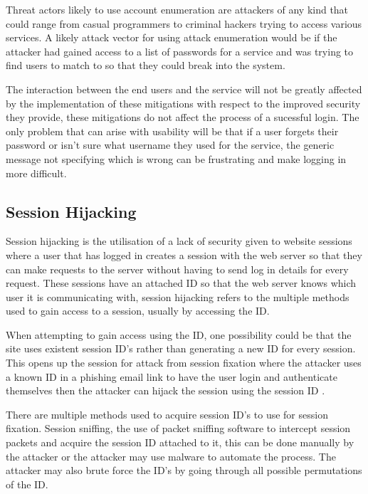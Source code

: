 \documentclass{ueacmpstyle}
\begin{document}
      Threat actors likely to use account enumeration are attackers of any kind that could 
      range from casual programmers to criminal hackers trying to access various services. 
      A likely attack vector for using attack enumeration would be if the attacker had 
      gained access to a list of passwords for a service and was trying to find users to 
      match to so that they could break into the system.

      The interaction between the end users and the service will not be greatly affected 
      by the implementation of these mitigations with respect to the improved security 
      they provide, these mitigations do not affect the process of a sucessful login. 
      The only problem that can arise with usability will be that if a user forgets their 
      password or isn't sure what username they used for the service, the generic message 
      not specifying which is wrong can be frustrating and make logging in more difficult. 

      \subsection{Session Hijacking}\label{sub:SessHijk}
      Session hijacking is the utilisation of a lack of security given to website sessions 
      where a user that has logged in creates a session with the web server so that they 
      can make requests to the server without having to send log in details for every 
      request. These sessions have an attached ID so that the web server knows which user 
      it is communicating with, session hijacking refers to the multiple methods used to 
      gain access to a session, usually by accessing the ID. 

      When attempting to gain access using the ID, one possibility could be that the site 
      uses existent session ID's rather than generating a new ID for every session. This 
      opens up the session for attack from session fixation where the attacker uses a 
      known ID in a phishing email link to have the user login and authenticate themselves 
      then the attacker can hijack the session using the session ID \citep{OWASPSessionFixation}.

      There are multiple methods used to acquire session ID's to use for session fixation. 
      Session sniffing, the use of packet sniffing software to intercept session packets 
      and acquire the session ID attached to it, this can be done manually by the attacker 
      or the attacker may use malware to automate the process. The attacker may also brute 
      force the ID's by going through all possible permutations of the ID.
\end{document}
